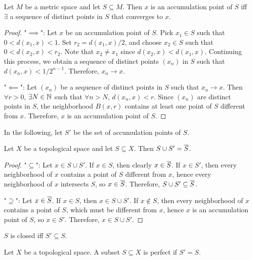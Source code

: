 \begin{prop}
    Let $M$ be a metric space and let $S \subseteq M$. Then $x$ is an accumulation point of $S$ iff $\exists$ a sequence of distinct points in $S$ that converges to $x$.
    \begin{proof}
        "$\implies$": Let $x$ be an accumulation point of $S$. Pick $x_1 \in S$ such that $0 < d(x_1, x) < 1$. Set $r_2 = d(x_1, x)/2$, and choose $x_2 \in S$ such that $0 < d(x_2, x) < r_2$. Note that $x_2 \neq x_1$ since $d(x_2, x) < d(x_1, x)$. Continuing this process, we obtain a sequence of distinct points $(x_n)$ in $S$ such that $d(x_n, x) < 1/2^{n-1}$. Therefore, $x_n \to x$.

        "$\impliedby$": Let $(x_n)$ be a sequence of distinct points in $S$ such that $x_n \to x$. Then $\forall r > 0$, $\exists N \in \N$ such that $\forall n > N$, $d(x_n, x) < r$. Since $(x_n)$ are distinct points in $S$, the neighborhood $B(x, r)$ contains at least one point of $S$ different from $x$. Therefore, $x$ is an accumulation point of $S$.
    \end{proof}
\end{prop}

In the following, let $S'$ be the set of accumulation points of $S$.

\begin{prop}
    Let $X$ be a topological space and let $S \subseteq X$. Then $S \cup S' = \Bar S$. 
    \begin{proof}
        "$\subseteq$": Let $x \in S \cup S'$. If $x \in S$, then clearly $x \in \Bar S$. If $x \in S'$, then every neighborhood of $x$ contains a point of $S$ different from $x$, hence every neighborhood of $x$ intersects $S$, so $x \in \Bar S$. Therefore, $S \cup S' \subseteq \Bar S$.

        "$\supseteq$": Let $x \in \Bar S$. If $x \in S$, then $x \in S \cup S'$. If $x \notin S$, then every neighborhood of $x$ contains a point of $S$, which must be different from $x$, hence $x$ is an accumulation point of $S$, so $x \in S'$. Therefore, $x \in S \cup S'$. 
    \end{proof}
\end{prop}

\begin{cl}
    $S$ is closed iff $S' \subseteq S$.
\end{cl}

\begin{df}
    Let $X$ be a topological space. A subset $S \subseteq X$ is perfect if $S' = S$. 
\end{df}

